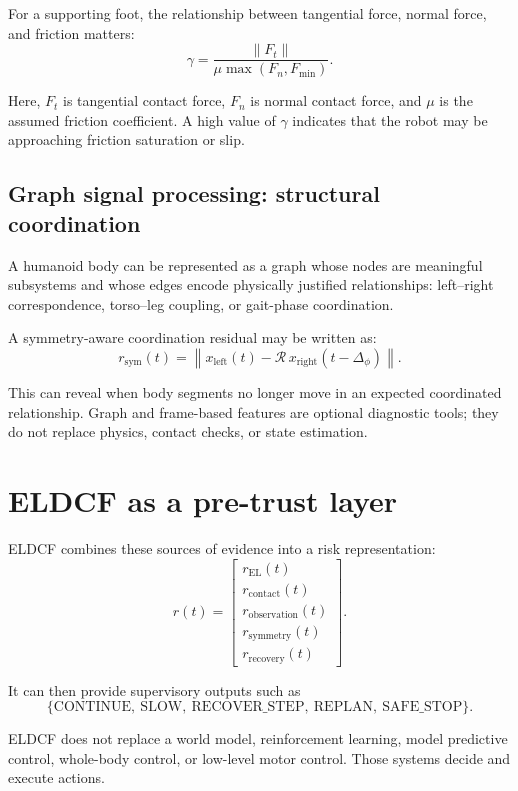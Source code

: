 \documentclass[11pt]{article}
\begin{document}
For a supporting foot, the relationship between tangential force, normal force, and friction matters:
\[
\gamma =
\frac{\lVert F_t \rVert}
{\mu \max(F_n,F_{\min})}.
\]

Here, $F_t$ is tangential contact force, $F_n$ is normal contact force, and $\mu$ is the assumed friction coefficient. A high value of $\gamma$ indicates that the robot may be approaching friction saturation or slip.

\subsection{Graph signal processing: structural coordination}

A humanoid body can be represented as a graph whose nodes are meaningful subsystems and whose edges encode physically justified relationships: left--right correspondence, torso--leg coupling, or gait-phase coordination.

A symmetry-aware coordination residual may be written as:
\[
r_{\mathrm{sym}}(t) =
\left\lVert
x_{\mathrm{left}}(t)
- \mathcal{R}\,
x_{\mathrm{right}}(t-\Delta_{\phi})
\right\rVert.
\]

This can reveal when body segments no longer move in an expected coordinated relationship. Graph and frame-based features are optional diagnostic tools; they do not replace physics, contact checks, or state estimation.

\section{ELDCF as a pre-trust layer}

ELDCF combines these sources of evidence into a risk representation:
\[
r(t) =
\begin{bmatrix}
r_{\mathrm{EL}}(t) \\
r_{\mathrm{contact}}(t) \\
r_{\mathrm{observation}}(t) \\
r_{\mathrm{symmetry}}(t) \\
r_{\mathrm{recovery}}(t)
\end{bmatrix}.
\]

It can then provide supervisory outputs such as
\[
\{\mathrm{CONTINUE},\ \mathrm{SLOW},\ \mathrm{RECOVER\_STEP},\ \mathrm{REPLAN},\ \mathrm{SAFE\_STOP}\}.
\]

ELDCF does not replace a world model, reinforcement learning, model predictive control, whole-body control, or low-level motor control. Those systems decide and execute actions.
\end{document}
